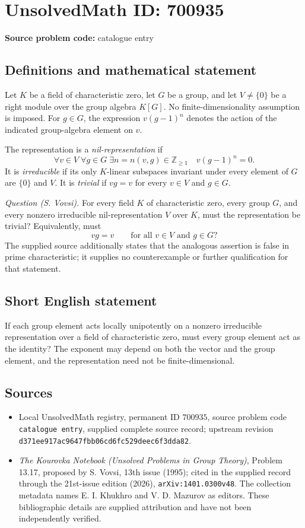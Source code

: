 \documentclass[11pt]{article}
\newcommand{\Z}{\mathbb{Z}}
\begin{document}
\section*{UnsolvedMath ID: 700935}
\textbf{Source problem code:} catalogue entry
\subsection{Definitions and mathematical statement}
Let \(K\) be a field of characteristic zero, let \(G\) be a group, and let \(V\ne\{0\}\) be a right module over the group algebra \(K[G]\). No finite-dimensionality assumption is imposed. For \(g\in G\), the expression \(v(g-1)^n\) denotes the action of the indicated group-algebra element on \(v\).

The representation is a \emph{nil-representation} if
\[
\forall v\in V\;\forall g\in G\;\exists n=n(v,g)\in\Z_{\ge1}
\quad v(g-1)^n=0.
\]
It is \emph{irreducible} if its only \(K\)-linear subspaces invariant under every element of \(G\) are \(\{0\}\) and \(V\). It is \emph{trivial} if \(vg=v\) for every \(v\in V\) and \(g\in G\).

\emph{Question (S. Vovsi).} For every field \(K\) of characteristic zero, every group \(G\), and every nonzero irreducible nil-representation \(V\) over \(K\), must the representation be trivial? Equivalently, must
\[
vg=v\qquad\text{for all }v\in V\text{ and }g\in G?
\]
The supplied source additionally states that the analogous assertion is false in prime characteristic; it supplies no counterexample or further qualification for that statement.
\subsection{Short English statement}
If each group element acts locally unipotently on a nonzero irreducible representation over a field of characteristic zero, must every group element act as the identity? The exponent may depend on both the vector and the group element, and the representation need not be finite-dimensional.
\subsection{Sources}
\begin{itemize}
\item Local UnsolvedMath registry, permanent ID \(700935\), source problem code \texttt{catalogue entry}, supplied complete source record; upstream revision \texttt{d371ee917ac9647fbb06cd6fc529deec6f3dda82}.
\item \emph{The Kourovka Notebook (Unsolved Problems in Group Theory)}, Problem 13.17, proposed by S. Vovsi, 13th issue (1995); cited in the supplied record through the 21st-issue edition (2026), \texttt{arXiv:1401.0300v48}. The collection metadata names E. I. Khukhro and V. D. Mazurov as editors. These bibliographic details are supplied attribution and have not been independently verified.
\end{itemize}
\end{document}
